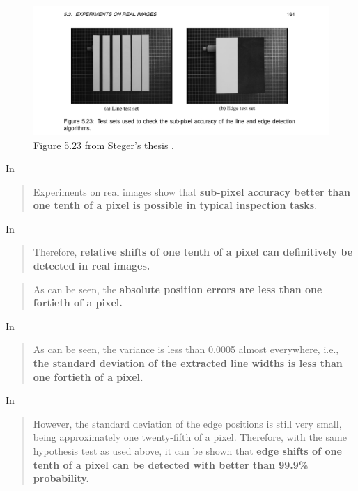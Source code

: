 \documentclass[a4paper,12pt]{article}
\begin{document}
\begin{figure}
  \centering
  \includegraphics[width=\textwidth]{Steger_Thesis_Fig5_23}
  \caption{Figure 5.23 from Steger's thesis \cite{Steger}.}
\end{figure}

In \cite[p.1]{Steger}
\begin{quotation}
Experiments on real images
show that \textbf{sub-pixel accuracy better than one tenth of a pixel is possible in typical inspection
tasks}.
\end{quotation}

In \cite[Section 5.3.2
Sub-Pixel Accuracy of Line Position and Width, p.164]{Steger}
\begin{quotation}
Therefore, \textbf{relative shifts of one tenth of a pixel can definitively be detected
in real images.}
\end{quotation}
\begin{quotation}
As can be seen, the \textbf{absolute position errors are less than
one fortieth of a pixel.}
\end{quotation}

In \cite[Section 5.3.2
Sub-Pixel Accuracy of Line Position and Width, p.165]{Steger}
\begin{quotation}
As can be seen, the variance is less than 0.0005 almost everywhere, i.e., \textbf{the standard
deviation of the extracted line widths is less than one fortieth of a pixel.}
\end{quotation}

In \cite[5.3.3 Sub-Pixel Accuracy of Edge Position, p.166]{Steger}
\begin{quotation}
However, the standard deviation of the edge positions is still very
small, being approximately one twenty-fifth of a pixel. Therefore, with the same hypothesis
test as used above, it can be shown that \textbf{edge shifts of one tenth of a pixel can be detected with
better than 99.9\% probability.}
\end{quotation}
\end{document}
